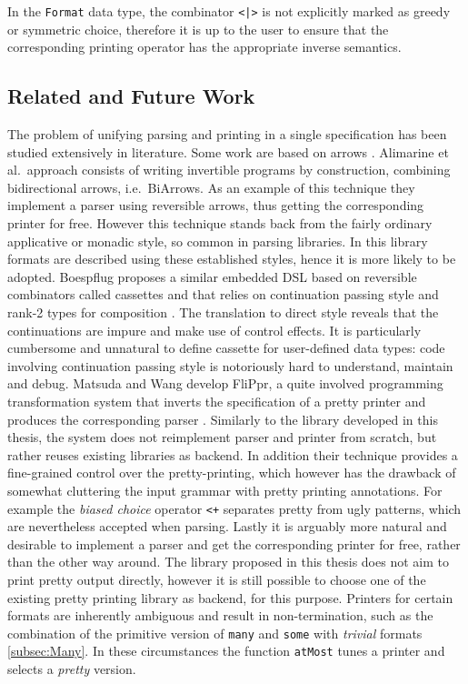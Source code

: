 \documentclass[../Thesis.tex]{subfiles}
\begin{document}
In the \texttt{Format} data type, the combinator \texttt{<|>} is not explicitly marked as greedy or symmetric choice, therefore it is up to the user to ensure that the corresponding printing operator has the appropriate inverse semantics.


\subsection{Related and Future Work}
\label{subsec:FormatRelatedWork}
The problem of unifying parsing and printing in a single specification
has been studied extensively in literature.
Some work are based on arrows \cite{Alimarine, PolyDataConv}.
Alimarine et al.\ approach consists of writing invertible programs by construction, combining bidirectional arrows, i.e.\ BiArrows.
As an example of this technique they implement a parser using reversible
arrows, thus getting the corresponding printer for free.
However this technique stands back from the fairly ordinary 
applicative or monadic style, so common in parsing libraries.
In this library formats are described using these established styles, hence it is more likely to be adopted.
Boespflug proposes a similar embedded DSL based on reversible combinators called cassettes and that relies on continuation passing style and rank-2 types 
for composition \cite{Boespflug}.
The translation to direct style reveals that the continuations are impure
and make use of control effects. It is particularly cumbersome and unnatural to define cassette for user-defined data types: code involving continuation 
passing style is notoriously hard to understand, maintain and debug.
Matsuda and Wang develop FliPpr, a quite involved programming transformation system that inverts the specification of a pretty printer and 
produces the corresponding parser \cite{FliPpr}.
Similarly to the library developed in this thesis, the system does not
reimplement parser and printer from scratch, but rather 
reuses existing libraries as backend. In addition their technique
provides a fine-grained control over the pretty-printing, which 
however has the drawback of somewhat cluttering the input grammar 
with pretty printing annotations.
For example the \emph{biased choice} operator \texttt{<+} separates 
pretty from ugly patterns, which are nevertheless accepted when
parsing. Lastly it is arguably more natural and desirable 
to implement a parser and get the corresponding printer for free, rather
than the other way around.
The library proposed in this thesis does not aim to print pretty output directly,
however it is still possible to choose one of the existing pretty printing
library \cite{Hughes95thedesign, Wadler98aprettier, SwierstraPP} as backend, for this purpose. Printers for certain formats are inherently ambiguous and
result in non-termination, such as the combination of the primitive version
of \texttt{many} and \texttt{some} with \emph{trivial} formats \ref{subsec:Many}. In these circumstances the function \texttt{atMost} 
tunes a printer and selects a \emph{pretty} version.
\end{document}

